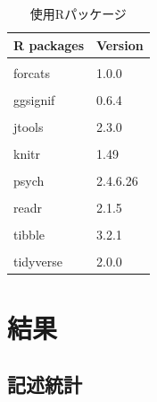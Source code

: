 \documentclass[12pt,a4paper,xelatex,ja=standard]{bxjsarticle}
\begin{document}
\begin{table}[!h]
\centering
\caption{\label{tab:unnamed-chunk-3}使用Rパッケージ}
\centering
\begin{tabular}[t]{ll}
\toprule
R packages & Version\\
\midrule
\cellcolor{gray!10}{dplyr} & \cellcolor{gray!10}{1.1.4}\\
forcats & 1.0.0\\
\cellcolor{gray!10}{ggplot2} & \cellcolor{gray!10}{3.5.1}\\
ggsignif & 0.6.4\\
\cellcolor{gray!10}{gridExtra} & \cellcolor{gray!10}{2.3}\\
\addlinespace
jtools & 2.3.0\\
\cellcolor{gray!10}{kableExtra} & \cellcolor{gray!10}{1.4.0}\\
knitr & 1.49\\
\cellcolor{gray!10}{lubridate} & \cellcolor{gray!10}{1.9.3}\\
psych & 2.4.6.26\\
\addlinespace
\cellcolor{gray!10}{purrr} & \cellcolor{gray!10}{1.0.2}\\
readr & 2.1.5\\
\cellcolor{gray!10}{stringr} & \cellcolor{gray!10}{1.5.1}\\
tibble & 3.2.1\\
\cellcolor{gray!10}{tidyr} & \cellcolor{gray!10}{1.3.1}\\
\addlinespace
tidyverse & 2.0.0\\
\bottomrule
\end{tabular}
\end{table}

\clearpage

\section{結果}\label{ux7d50ux679c}

\subsection{記述統計}\label{ux8a18ux8ff0ux7d71ux8a08}
\end{document}
